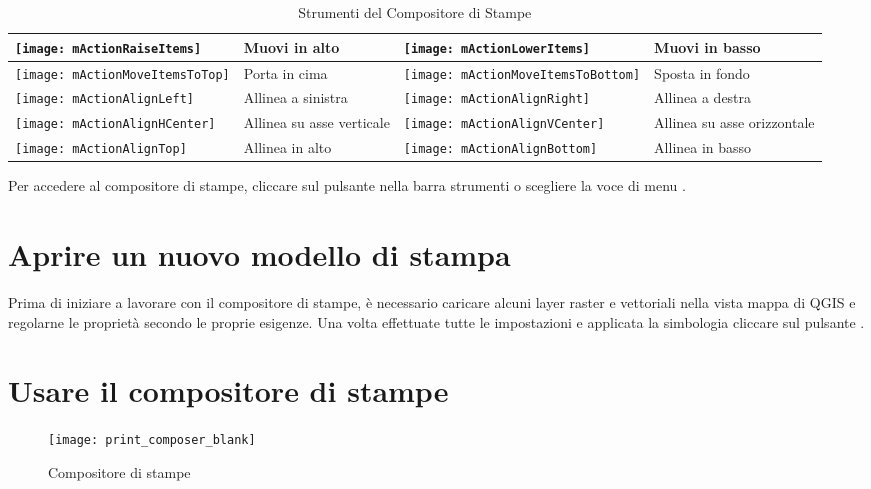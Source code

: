 \begin{table}[h]
\begin{tabular}{|m{1cm}|m{5.4cm}|m{1cm}|m{5.4cm}|}
 \hline \texttt{[image: mActionRaiseItems]} & Muovi in alto  &
 \texttt{[image: mActionLowerItems]} & Muovi in basso \\
 \hline \texttt{[image: mActionMoveItemsToTop]} & Porta in cima &
 \texttt{[image: mActionMoveItemsToBottom]} & Sposta in fondo \\
 \hline \texttt{[image: mActionAlignLeft]} & Allinea a sinistra &
 \texttt{[image: mActionAlignRight]} & Allinea a destra \\
 \hline \texttt{[image: mActionAlignHCenter]} & Allinea su asse verticale &
 \texttt{[image: mActionAlignVCenter]} & Allinea su asse orizzontale \\
 \hline \texttt{[image: mActionAlignTop]} & Allinea in alto &
 \texttt{[image: mActionAlignBottom]} & Allinea in basso \\
\hline
\end{tabular}
\caption{Strumenti del Compositore di Stampe}\label{tab:printcomposer_tools}
\end{table}

Per accedere al compositore di stampe, cliccare sul pulsante
 nella barra strumenti 
o scegliere la voce di menu  \arrow {}.

\section{Aprire un nuovo modello di stampa}\label{label_useprintcomposer} 

Prima di iniziare a lavorare con il compositore di stampe, è necessario
caricare alcuni layer raster e vettoriali nella vista mappa di QGIS e
regolarne le proprietà secondo le proprie esigenze. Una volta effettuate
tutte le impostazioni e applicata la simbologia cliccare sul pulsante
.

\section{Usare il compositore di stampe}\label{label_useprintcomposer}

\begin{figure}[ht]
   \centering
   \texttt{[image: print\_composer\_blank]}
   \caption{Compositore di stampe \nixcaption}\label{fig:print_composer_blank}
\end{figure}

